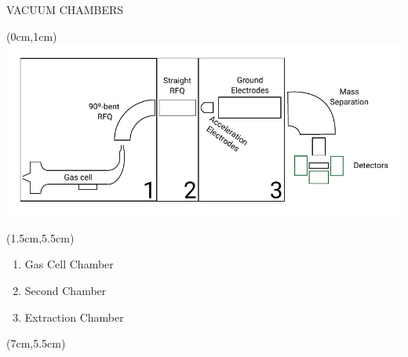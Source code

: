\documentclass[9pt]{beamer}
\begin{document}
\begin{frame}{VACUUM CHAMBERS}
    \begin{textblock*}{13cm}(0cm,1cm)
            \centering
            {\includegraphics[scale=.8]{assets/LEBdiff.pdf}}
    \end{textblock*}
    
     \begin{textblock*}{5cm}(1.5cm,5.5cm)
      \vspace{2em}
        \begin{enumerate}
            \item<2-> Gas Cell Chamber
            \item<3-> Second Chamber
            \item<4-> Extraction Chamber
        \end{enumerate}
    \end{textblock*}
        
    \begin{textblock*}{5cm}(7cm,5.5cm)
        \vspace{2em}
        \centering
    \end{textblock*}
\end{frame}

\end{document}
